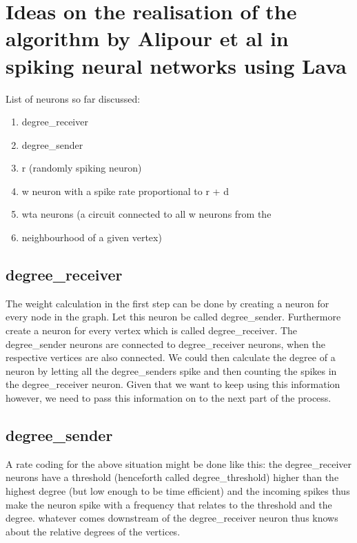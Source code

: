 \chapter{Ideas on the realisation of the algorithm by Alipour et al
in spiking neural networks using Lava}\label{chap:ideas_v1}
List of neurons so far discussed:
\begin{enumerate}
    \item degree\_receiver
    \item degree\_sender
    \item r (randomly spiking neuron)
    \item w neuron with a spike rate proportional to r + d
    \item wta neurons (a circuit connected to all w neurons from the
    \item neighbourhood of a given vertex)
\end{enumerate}

\section{degree\_receiver}\label{sec:degree_receiver}
The weight calculation in the first step can be done by creating a neuron for
every node in the graph. Let this neuron be called degree\_sender. Furthermore
create a neuron for every vertex which is called degree\_receiver. The
degree\_sender neurons are connected to degree\_receiver neurons, when the
respective vertices are also connected. We could then calculate the degree of a
neuron by letting all the degree\_senders spike and then counting the spikes in
the degree\_receiver neuron. Given that we want to keep using this information
however, we need to pass this information on to the next part of the process.

\section{degree\_sender}\label{sec:degree_sender}
A rate coding for the above situation might be done like this: the
degree\_receiver neurons have a threshold (henceforth called
degree\_threshold) higher than the highest degree (but low enough to be time
efficient) and the incoming spikes thus make the neuron spike with a frequency
that relates to the threshold and the degree. whatever comes downstream of
the degree\_receiver neuron thus knows about the relative degrees of the
vertices.
